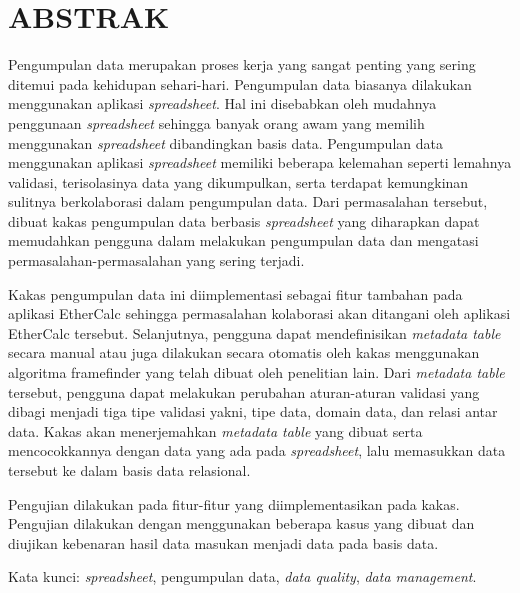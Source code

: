\clearpage
\chapter*{ABSTRAK}

Pengumpulan data merupakan proses kerja yang sangat penting yang sering ditemui pada kehidupan sehari-hari. Pengumpulan data biasanya dilakukan menggunakan aplikasi \textit{spreadsheet}. Hal ini disebabkan oleh mudahnya penggunaan \textit{spreadsheet} sehingga banyak orang awam yang memilih menggunakan \textit{spreadsheet} dibandingkan basis data. Pengumpulan data menggunakan aplikasi \textit{spreadsheet} memiliki beberapa kelemahan seperti lemahnya validasi, terisolasinya data yang dikumpulkan, serta terdapat kemungkinan sulitnya berkolaborasi dalam pengumpulan data. Dari permasalahan tersebut, dibuat kakas pengumpulan data berbasis \textit{spreadsheet} yang diharapkan dapat memudahkan pengguna dalam melakukan pengumpulan data dan mengatasi permasalahan-permasalahan yang sering terjadi.

Kakas pengumpulan data ini diimplementasi sebagai fitur tambahan pada aplikasi EtherCalc sehingga permasalahan kolaborasi akan ditangani oleh aplikasi EtherCalc tersebut. Selanjutnya, pengguna dapat mendefinisikan \textit{metadata table} secara manual atau juga dilakukan secara otomatis oleh kakas menggunakan algoritma framefinder yang telah dibuat oleh penelitian lain. Dari \textit{metadata table} tersebut, pengguna dapat melakukan perubahan aturan-aturan validasi yang dibagi menjadi tiga tipe validasi yakni, tipe data, domain data, dan relasi antar data. Kakas akan menerjemahkan \textit{metadata table} yang dibuat serta mencocokkannya dengan data yang ada pada \textit{spreadsheet}, lalu memasukkan data tersebut ke dalam basis data relasional.

Pengujian dilakukan pada fitur-fitur yang diimplementasikan pada kakas. Pengujian dilakukan dengan menggunakan beberapa kasus yang dibuat dan diujikan kebenaran hasil data masukan menjadi data pada basis data.

\vspace{15mm}
Kata kunci: \textit{spreadsheet}, pengumpulan data, \textit{data quality}, \textit{data management}.
\clearpage